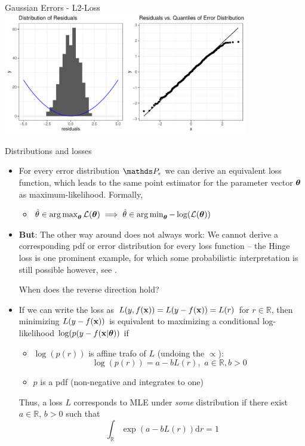 \documentclass[11pt,compress,t,notes=noshow, xcolor=table]{beamer}
\begin{document}
\begin{vbframe}{Gaussian Errors - L2-Loss}
\includegraphics[width = 0.8\textwidth]{figure/residuals_plot_L2.pdf}

\end{vbframe}

\begin{vbframe}{Distributions and losses}

\begin{itemize} 
\item For every error distribution $\P_\eps$ we can derive an equivalent loss function, which leads to the same point estimator for the parameter vector $\bm{\theta}$ as maximum-likelihood. Formally,
\begin{itemize}
    \item $\hat{\theta} \in \operatorname{arg\,max}_{\bm{\theta}} \mathcal{L}(\bm{\theta}) \implies \hat{\theta} \in \operatorname{arg\,min}_{\bm{\theta}}-\log(\mathcal{L}(\bm{\theta}))$  %
\end{itemize}
\item \textbf{But}: The other way around does not always work: We cannot derive a corresponding pdf or error distribution for every loss function -- the Hinge loss is one prominent example, for which some probabilistic interpretation is still possible however, see .

\framebreak

When does the reverse direction hold?
\item If we can write the loss as $L(y,f(\mathbf{x}))=L(y-f(\mathbf{x}))=L(r)$ for $r \in \mathbb{R}$, then minimizing $L(y-f(\mathbf{x}))$ is equivalent to maximizing a conditional log-likelihood $\log(p(y-f(\mathbf{x}|\bm{\theta}))$ if
\begin{itemize}
 \setlength{\itemsep}{1.2em}
    \item $\log(p(r))$ is affine trafo of $L$ (undoing the $\propto$):
    $$\log(p(r)) = a - bL(r),\,\,a \in \mathbb{R}, b>0$$
    \item  $p$ is a pdf (non-negative and integrates to one)
\end{itemize}
\lz
Thus, a loss $L$ corresponds to MLE under \textit{some} distribution if there exist $a \in \mathbb{R},\, b>0$ such that
$$ \int_{\mathbb{R}} \exp(a-bL(r))\text{d}r = 1$$
\end{itemize}
    
\end{vbframe}


\endlecture
\end{document}
